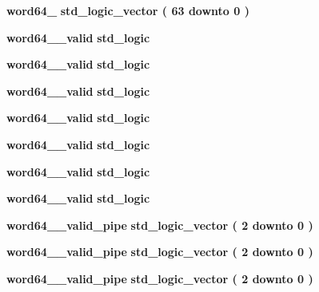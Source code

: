 \begin{DoxyCompactItemize}
\item 
{\bf word64\+\_} {\bfseries \textcolor{comment}{std\+\_\+logic\+\_\+vector}\textcolor{vhdlchar}{ }\textcolor{vhdlchar}{(}\textcolor{vhdlchar}{ }\textcolor{vhdlchar}{ } \textcolor{vhdldigit}{63} \textcolor{vhdlchar}{ }\textcolor{keywordflow}{downto}\textcolor{vhdlchar}{ }\textcolor{vhdlchar}{ } \textcolor{vhdldigit}{0} \textcolor{vhdlchar}{ }\textcolor{vhdlchar}{)}\textcolor{vhdlchar}{ }} 
\item 
{\bf word64\+\_\+\_\+valid} {\bfseries \textcolor{comment}{std\+\_\+logic}\textcolor{vhdlchar}{ }} 
\item 
{\bf word64\+\_\+\_\+valid} {\bfseries \textcolor{comment}{std\+\_\+logic}\textcolor{vhdlchar}{ }} 
\item 
{\bf word64\+\_\+\_\+valid} {\bfseries \textcolor{comment}{std\+\_\+logic}\textcolor{vhdlchar}{ }} 
\item 
{\bf word64\+\_\+\_\+valid} {\bfseries \textcolor{comment}{std\+\_\+logic}\textcolor{vhdlchar}{ }} 
\item 
{\bf word64\+\_\+\_\+valid} {\bfseries \textcolor{comment}{std\+\_\+logic}\textcolor{vhdlchar}{ }} 
\item 
{\bf word64\+\_\+\_\+valid} {\bfseries \textcolor{comment}{std\+\_\+logic}\textcolor{vhdlchar}{ }} 
\item 
{\bf word64\+\_\+\_\+valid} {\bfseries \textcolor{comment}{std\+\_\+logic}\textcolor{vhdlchar}{ }} 
\item 
{\bf word64\+\_\+\_\+valid\+\_\+pipe} {\bfseries \textcolor{comment}{std\+\_\+logic\+\_\+vector}\textcolor{vhdlchar}{ }\textcolor{vhdlchar}{(}\textcolor{vhdlchar}{ }\textcolor{vhdlchar}{ } \textcolor{vhdldigit}{2} \textcolor{vhdlchar}{ }\textcolor{keywordflow}{downto}\textcolor{vhdlchar}{ }\textcolor{vhdlchar}{ } \textcolor{vhdldigit}{0} \textcolor{vhdlchar}{ }\textcolor{vhdlchar}{)}\textcolor{vhdlchar}{ }} 
\item 
{\bf word64\+\_\+\_\+valid\+\_\+pipe} {\bfseries \textcolor{comment}{std\+\_\+logic\+\_\+vector}\textcolor{vhdlchar}{ }\textcolor{vhdlchar}{(}\textcolor{vhdlchar}{ }\textcolor{vhdlchar}{ } \textcolor{vhdldigit}{2} \textcolor{vhdlchar}{ }\textcolor{keywordflow}{downto}\textcolor{vhdlchar}{ }\textcolor{vhdlchar}{ } \textcolor{vhdldigit}{0} \textcolor{vhdlchar}{ }\textcolor{vhdlchar}{)}\textcolor{vhdlchar}{ }} 
\item 
{\bf word64\+\_\+\_\+valid\+\_\+pipe} {\bfseries \textcolor{comment}{std\+\_\+logic\+\_\+vector}\textcolor{vhdlchar}{ }\textcolor{vhdlchar}{(}\textcolor{vhdlchar}{ }\textcolor{vhdlchar}{ } \textcolor{vhdldigit}{2} \textcolor{vhdlchar}{ }\textcolor{keywordflow}{downto}\textcolor{vhdlchar}{ }\textcolor{vhdlchar}{ } \textcolor{vhdldigit}{0} \textcolor{vhdlchar}{ }\textcolor{vhdlchar}{)}\textcolor{vhdlchar}{ }} 

\end{DoxyCompactItemize}
